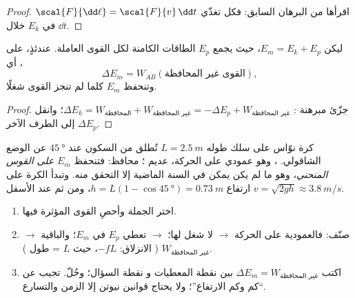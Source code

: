 \begin{proof}
اقرأها من البرهان السابق: فكل  تغذّي
$\scal{F}{\dd\ell} = \scal{F}{v}\,\dd t$ في $E_k$ خلال $\dd t$.
\end{proof}

\begin{theorem}\label{thm:g12:work-and-energy:emtheorem}
ليكن $E_m = E_k + E_p$، حيث يجمع $E_p$ الطاقات الكامنة
لكل القوى  العاملة. عندئذٍ، على أي ،
\[
\Delta E_m = W_{AB}(\text{القوى غير المحافظة}),
\]
وتنحفظ $E_m$ كلما لم تنجز القوى  شغلًا.
\end{theorem}

\begin{proof}
جزّئ مبرهنة : $\Delta E_k = W_{\text{المحافظة}} +
W_{\text{غير المحافظة}} = -\Delta E_p + W_{\text{غير المحافظة}}$؛ وانقل $\Delta E_p$ إلى الطرف الآخر.
\end{proof}

\begin{example}\label{ex:g12:work-and-energy:pendulum}
كرة نوّاس على سلك طوله $L = \qty{2.5}{m}$ تُطلق من
السكون عند $\qty{45}{\degree}$ عن الوضع الشاقولي. ،
وهو عمودي على الحركة، عديم ؛  محافظ:
فتنحفظ $E_m$ \emph{على القوس المنحني}، وهو ما لم يكن يمكن في السنة الماضية
إلا التحقق منه. وتبدأ الكرة على ارتفاع $h = L(1 - \cos\qty{45}{\degree}) =
\qty{0.73}{m}$، ومن ثم عند الأسفل $v = \sqrt{2gh} \approx
\qty{3.8}{m/s}$.
\end{example}

\begin{method}\label{met:g12:work-and-energy:audit}
\begin{enumerate}
  \item اختر الجملة وأحصِ القوى المؤثرة فيها.
  \item صنّف: فالعمودية على الحركة $\to$ لا شغل لها؛ 
        $\to$ تعطي $E_p$ في $E_m$؛ والباقية $\to$ $W_{\text{غير المحافظة}}$
        ( الانزلاق: $-fL$، حيث $L$ = طول ).
  \item اكتب $\Delta E_m = W_{\text{غير المحافظة}}$ بين نقطة المعطيات و
        نقطة السؤال؛ وحُلّ.  تجيب عن ``كم  وكم
        الارتفاع''؛ ولا يحتاج قوانين نيوتن إلا الزمن والتسارع.
\end{enumerate}
\end{method}

